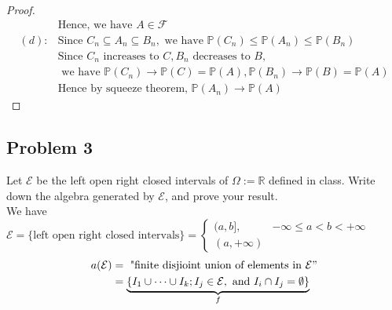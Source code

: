 \documentclass[letterpaper, 11pt]{article}
\newcommand{\1}{\mathds{1}}	%
\theoremstyle{definition}
\begin{document}
\begin{proof}
\begin{align*}{}{}
  &\text{Hence, we have } A \in \mathcal{F} \\
  (d):&\text{Since } C_{n} \subseteq A_{n} \subseteq B_{n},\text{ we have } \mathbb{P}(C_{n}) \leq \mathbb{P}(A_{n}) \leq \mathbb{P}(B_{n}) \\
  &\text{Since } C_{n} \text{ increases to } C, B_{n} \text{ decreases to } B, \\
  &\text{ we have } \mathbb{P}(C_{n}) \rightarrow \mathbb{P}(C)=\mathbb{P}(A), \mathbb{P}(B_{n}) \rightarrow \mathbb{P}(B)=\mathbb{P}(A) \\
  &\text{Hence by squeeze theorem, } \mathbb{P}(A_{n}) \rightarrow \mathbb{P}(A)
  \end{align*}
\end{proof}
\subsection*{Problem 3}
Let $\mathcal{E}$ be the left open right closed intervals of $\Omega := \mathbb{R}$ defined in class. Write down the algebra generated by $\mathcal{E}$, and prove your result.
\\We have $\mathcal{E} = \{\text{left open right closed intervals}\} = 
\begin{cases}
    (a,b], & -\infty \leq a < b < +\infty \\
    (a,+\infty)
\end{cases}$
\begin{align*}a(\mathcal{E})&=\text{  "finite disjioint union of elements in }\mathcal{E}"
  \\&=\underbrace{\{ I_1\cup\cdots\cup I_k;I_j \in \mathcal{E} , \text{ and } I_i \cap I_j =\emptyset \}}_f
  \end{align*}
\end{document}
